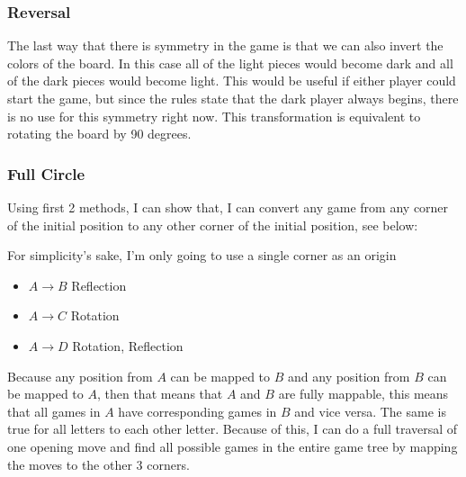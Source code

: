 \documentclass{article}
\begin{document}
\newpage

\subsubsection{Reversal}

The last way that there is symmetry in the game is that we can also invert the colors of the board. In this case all of the light pieces would become dark and all of the dark pieces would become light. This would be useful if either player could start the game, but since the rules state that the dark player always begins, there is no use for this symmetry right now. This transformation is equivalent to rotating the board by 90 degrees.

\subsubsection{Full Circle}

Using first 2 methods, I can show that, I can convert any game from any corner of the initial position to any other corner of the initial position, see below:

\begin{othelloboard}{0.5}
\dotmarkings
{}
\end{othelloboard}

For simplicity's sake, I'm only going to use a single corner as an origin

\begin{itemize}
\item $A\rightarrow B$ Reflection
\item $A\rightarrow C$ Rotation
\item $A\rightarrow D$ Rotation, Reflection
\end{itemize}

Because any position from $A$ can be mapped to $B$ and any position from $B$ can be mapped to $A$, then that means that $A$ and $B$ are fully mappable, this means that all games in $A$ have corresponding games in $B$ and vice versa. The same is true for all letters to each other letter. Because of this, I can do a full traversal of one opening move and find all possible games in the entire game tree by mapping the moves to the other 3 corners.
\end{document}
